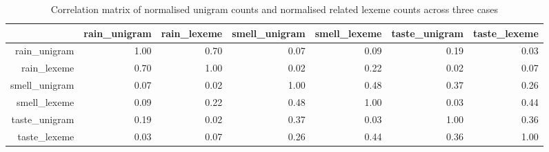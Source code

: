 \begin{table}[ht]
\centering
\begin{tabular}{rrrrrrr}
  \hline
 & rain\_unigram & rain\_lexeme & smell\_unigram & smell\_lexeme & taste\_unigram & taste\_lexeme \\ 
  \hline
rain\_unigram & 1.00 & 0.70 & 0.07 & 0.09 & 0.19 & 0.03 \\ 
  rain\_lexeme & 0.70 & 1.00 & 0.02 & 0.22 & 0.02 & 0.07 \\ 
  smell\_unigram & 0.07 & 0.02 & 1.00 & 0.48 & 0.37 & 0.26 \\ 
  smell\_lexeme & 0.09 & 0.22 & 0.48 & 1.00 & 0.03 & 0.44 \\ 
  taste\_unigram & 0.19 & 0.02 & 0.37 & 0.03 & 1.00 & 0.36 \\ 
  taste\_lexeme & 0.03 & 0.07 & 0.26 & 0.44 & 0.36 & 1.00 \\ 
   \hline
\end{tabular}
\caption{Correlation matrix of normalised unigram counts and normalised related lexeme counts across three cases} 
\label{tab:lex_uni_cor}
\end{table}
